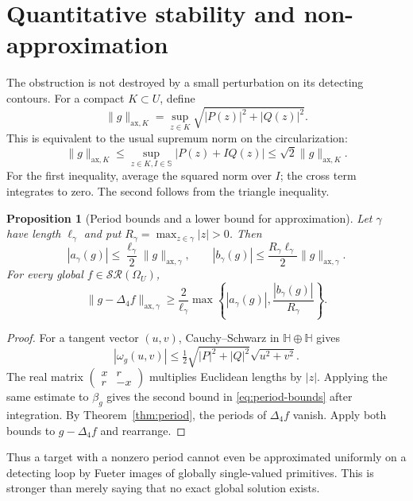 \documentclass[11pt,a4paper]{article}
\numberwithin{equation}{section}
\newtheorem{proposition}[theorem]{Proposition}
\theoremstyle{definition}
\theoremstyle{remark}
\newcommand{\HH}{\mathbb H}
\newcommand{\SSS}{\mathbb S}
\newcommand{\SR}{\mathcal{SR}}
\newcommand{\Fu}{\Delta_4}
\newcommand{\ax}{\mathrm{ax}}
\newcommand{\norm}[1]{\lVert#1\rVert}
\begin{document}
\section{Quantitative stability and non-approximation}
\label{sec:stability}
The obstruction is not destroyed by a small perturbation on its detecting
contours. For a compact $K\subset U$, define
\begin{equation}
 \norm{g}_{\ax,K}=\sup_{z\in K}\sqrt{|P(z)|^2+|Q(z)|^2}.
 \label{eq:axnorm}
\end{equation}
This is equivalent to the usual supremum norm on the circularization:
\begin{equation}
 \norm{g}_{\ax,K}\le
 \sup_{z\in K,I\in\SSS}|P(z)+IQ(z)|
 \le\sqrt2\norm{g}_{\ax,K}.\label{eq:norm-equivalence}
\end{equation}
For the first inequality, average the squared norm over $I$; the cross
term integrates to zero. The second follows from the triangle inequality.

\begin{proposition}[Period bounds and a lower bound for approximation]
\label{prop:distance}
Let $\gamma$ have length $\ell_\gamma$ and put
$R_\gamma=\max_{z\in\gamma}|z|>0$. Then
\begin{equation}
 |a_\gamma(g)|\le\frac{\ell_\gamma}{2}\norm{g}_{\ax,\gamma},
 \qquad
 |b_\gamma(g)|\le\frac{R_\gamma\ell_\gamma}{2}
                                  \norm{g}_{\ax,\gamma}.
 \label{eq:period-bounds}
\end{equation}
For every global $f\in\SR(\Omega_U)$,
\begin{equation}
 \norm{g-\Fu f}_{\ax,\gamma}\ge
 \frac{2}{\ell_\gamma}
 \max\left\{|a_\gamma(g)|,\frac{|b_\gamma(g)|}{R_\gamma}\right\}.
 \label{eq:distance-lower}
\end{equation}
\end{proposition}
\begin{proof}
For a tangent vector $(u,v)$, Cauchy--Schwarz in $\HH\oplus\HH$ gives
\[
 |\omega_g(u,v)|\le\tfrac12\sqrt{|P|^2+|Q|^2}\sqrt{u^2+v^2}.
\]
The real matrix
$\left(\begin{smallmatrix}x&r\\r&-x\end{smallmatrix}\right)$
multiplies Euclidean lengths by $|z|$. Applying the same estimate to
$\beta_g$ gives the second bound in \eqref{eq:period-bounds} after
integration. By Theorem~\ref{thm:period}, the periods of $\Fu f$ vanish.
Apply both bounds to $g-\Fu f$ and rearrange.
\end{proof}
Thus a target with a nonzero period cannot even be approximated uniformly
on a detecting loop by Fueter images of globally single-valued primitives.
This is stronger than merely saying that no exact global solution exists.
\end{document}
